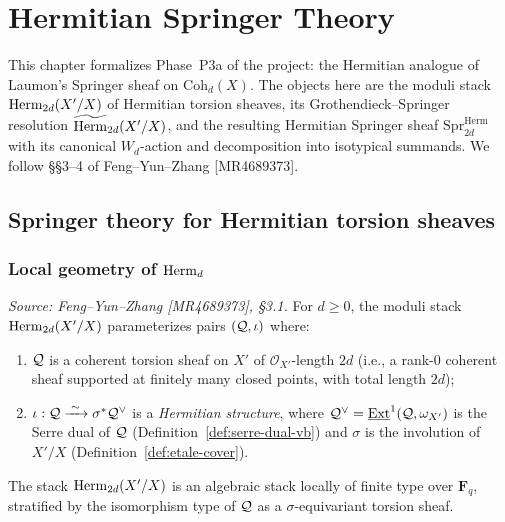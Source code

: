 \chapter{Hermitian Springer Theory}
\label{chap:hermitian-springer}

This chapter formalizes Phase~P3a of the project: the Hermitian analogue of Laumon's
Springer sheaf on \(\mathrm{Coh}_d(X)\). The objects here are the moduli stack
\(\operatorname{Herm}_{2d}(X'/X)\) of Hermitian torsion sheaves, its Grothendieck--Springer resolution
\(\widetilde{\operatorname{Herm}}_{2d}(X'/X)\), and the resulting Hermitian Springer sheaf
\(\mathrm{Spr}^{\mathrm{Herm}}_{2d}\) with its canonical \(W_d\)-action and
decomposition into isotypical summands. We follow \S\S3--4 of Feng--Yun--Zhang
[MR4689373].

\section{Springer theory for Hermitian torsion sheaves}

\subsection{Local geometry of $\operatorname{Herm}_{d}$}

\begin{definition}
  \label{def:herm-torsion-stack}
  \textit{Source: Feng--Yun--Zhang [MR4689373], \S3.1.}
  For \(d \geq 0\), the moduli stack \(\operatorname{Herm}_{2d}(X'/X)\) parameterizes pairs
  \((\mathcal{Q}, \iota)\) where:
  \begin{enumerate}
    \item \(\mathcal{Q}\) is a coherent torsion sheaf on \(X'\) of \(\mathcal{O}_{X'}\)-length
      \(2d\) (i.e., a rank-0 coherent sheaf supported at finitely many closed points,
      with total length \(2d\));
    \item \(\iota : \mathcal{Q} \xrightarrow{\;\sim\;} \sigma^*\mathcal{Q}^\vee\) is a
      \emph{Hermitian structure}, where \(\mathcal{Q}^\vee = \underline{\mathrm{Ext}}^1(\mathcal{Q},
      \omega_{X'})\) is the Serre dual of \(\mathcal{Q}\) (Definition~\ref{def:serre-dual-vb})
      and \(\sigma\) is the involution of \(X'/X\) (Definition~\ref{def:etale-cover}).
  \end{enumerate}
  The stack \(\operatorname{Herm}_{2d}(X'/X)\) is an algebraic stack locally of finite type over
  \(\mathbf{F}_q\), stratified by the isomorphism type of \(\mathcal{Q}\) as a
  \(\sigma\)-equivariant torsion sheaf.
\end{definition}

